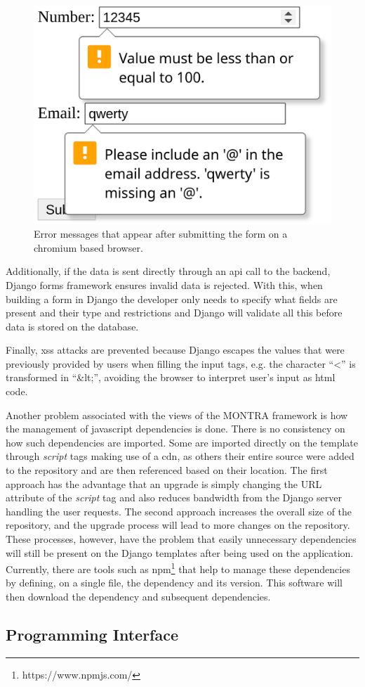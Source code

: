 \begin{figure}[H]
    \center
    \includegraphics[width=.3\textwidth]{html-form-validation}
    \caption{Error messages that appear after submitting the form on a chromium based browser.}
    \label{fig:html-form-validation}
\end{figure}

Additionally, if the data is sent directly through an \gls{api} call to the backend, Django forms framework ensures invalid data is rejected.
With this, when building a form in Django the developer only needs to specify what fields are present and their type and restrictions and Django will validate all this before data is stored on the database.

Finally, \gls{xss} attacks are prevented because Django escapes the values that were previously provided by users when filling the input tags, e.g. the character ``<'' is transformed in ``\&lt;'', avoiding the browser to interpret user's input as \gls{html} code.

Another problem associated with the views of the MONTRA framework is how the management of javascript dependencies is done.
There is no consistency on how such dependencies are imported.
Some are imported directly on the template through \textit{script} tags making use of a \gls{cdn}, as others their entire source were added to the repository and are then referenced based on their location.
The first approach has the advantage that an upgrade is simply changing the URL attribute of the \textit{script} tag and also reduces bandwidth from the Django server handling the user requests.
The second approach increases the overall size of the repository, and the upgrade process will lead to more changes on the repository.
These processes, however, have the problem that easily unnecessary dependencies will still be present on the Django templates after being used on the application.
Currently, there are tools such as \gls{npm}\footnote{https://www.npmjs.com/} that help to manage these dependencies by defining, on a single file, the dependency and its version.
This software will then download the dependency and subsequent dependencies.

\subsection*{Programming Interface}

